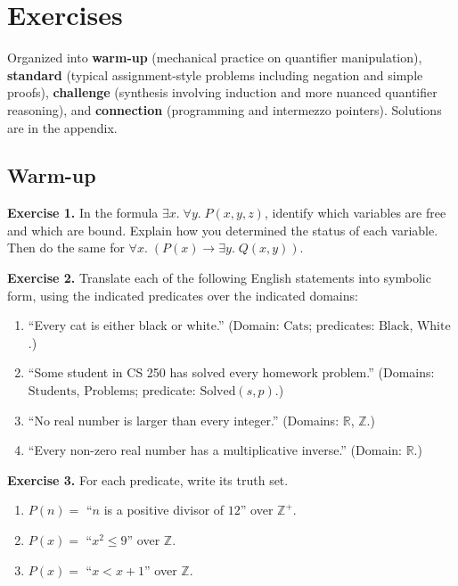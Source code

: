 \documentclass[11pt]{article}
\begin{document}
\section{Exercises}

Organized into \textbf{warm-up} (mechanical practice on quantifier manipulation), \textbf{standard} (typical assignment-style problems including negation and simple proofs), \textbf{challenge} (synthesis involving induction and more nuanced quantifier reasoning), and \textbf{connection} (programming and intermezzo pointers). Solutions are in the appendix.

\subsection*{Warm-up}

\textbf{Exercise 1.}\label{ex:m4:1} In the formula $\exists x.\; \forall y.\; P(x, y, z)$, identify which variables are free and which are bound. Explain how you determined the status of each variable. Then do the same for $\forall x.\; (P(x) \to \exists y.\; Q(x, y))$.

\bigskip
\textbf{Exercise 2.}\label{ex:m4:2} Translate each of the following English statements into symbolic form, using the indicated predicates over the indicated domains:
\begin{enumerate}[label=(\alph*)]
  \item ``Every cat is either black or white.'' (Domain: $\text{Cats}$; predicates: $\text{Black}$, $\text{White}$.)
  \item ``Some student in CS 250 has solved every homework problem.'' (Domains: $\text{Students}$, $\text{Problems}$; predicate: $\text{Solved}(s, p)$.)
  \item ``No real number is larger than every integer.'' (Domains: $\mathbb{R}$, $\mathbb{Z}$.)
  \item ``Every non-zero real number has a multiplicative inverse.'' (Domain: $\mathbb{R}$.)
\end{enumerate}

\bigskip
\textbf{Exercise 3.}\label{ex:m4:3} For each predicate, write its truth set.
\begin{enumerate}[label=(\alph*)]
  \item $P(n) = $ ``$n$ is a positive divisor of $12$'' over $\mathbb{Z}^+$.
  \item $P(x) = $ ``$x^2 \leq 9$'' over $\mathbb{Z}$.
  \item $P(x) = $ ``$x < x + 1$'' over $\mathbb{Z}$.
\end{enumerate}
\end{document}
